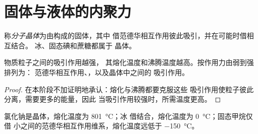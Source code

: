 \section{固体与液体的内聚力}

\begin{definition}[分子晶体]\label{def:g11:polarity-and-cohesion:molecular-solid}
称\emph{分子晶体}为由构成的固体，其中
借范德华相互作用彼此吸引，并在可能时借相互结合。
冰、固态碘和蔗糖都属于
晶体。
\end{definition}

\begin{proposition}[内聚与相变]\label{prop:g11:polarity-and-cohesion:cohesion}
物质粒子之间的吸引作用越强，
其熔化温度和沸腾温度越高。按作用力由弱到强排列为：
范德华相互作用、，以及晶体中之间的
吸引作用。
\end{proposition}

\begin{proof}
在本阶段不加证明地承认：熔化与沸腾都要克服这些
吸引作用使粒子彼此分离，需要更多的能量，因此
当吸引作用较强时，所需温度更高。
\end{proof}

\begin{example}[三种固体]\label{ex:g11:polarity-and-cohesion:three}
氯化钠是晶体，熔化温度为 \qty{801}{\celsius}；冰
借结合，熔化温度为 \qty{0}{\celsius}；固态甲烷仅借
小之间的范德华相互作用维系，熔化温度远低于
\qty{-150}{\celsius}。
\end{example}

